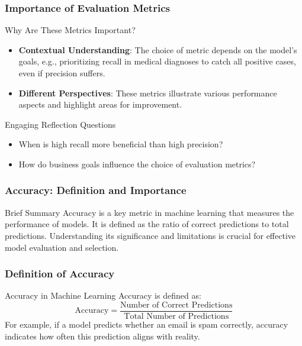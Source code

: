 \documentclass[aspectratio=169]{beamer}
\begin{document}
\begin{frame}[fragile]
    \frametitle{Importance of Evaluation Metrics}
    \begin{block}{Why Are These Metrics Important?}
        \begin{itemize}
            \item \textbf{Contextual Understanding}: The choice of metric depends on the model's goals, e.g., prioritizing recall in medical diagnoses to catch all positive cases, even if precision suffers.
            \item \textbf{Different Perspectives}: These metrics illustrate various performance aspects and highlight areas for improvement.
        \end{itemize}
    \end{block}
    
    \begin{block}{Engaging Reflection Questions}
        \begin{itemize}
            \item When is high recall more beneficial than high precision?
            \item How do business goals influence the choice of evaluation metrics?
        \end{itemize}
    \end{block}
\end{frame}

\begin{frame}[fragile]
    \frametitle{Accuracy: Definition and Importance}
    \begin{block}{Brief Summary}
        Accuracy is a key metric in machine learning that measures the performance of models. It is defined as the ratio of correct predictions to total predictions. Understanding its significance and limitations is crucial for effective model evaluation and selection.
    \end{block}
\end{frame}

\begin{frame}[fragile]
    \frametitle{Definition of Accuracy}
    \begin{block}{Accuracy in Machine Learning}
        Accuracy is defined as:
        \begin{equation} 
        \text{Accuracy} = \frac{\text{Number of Correct Predictions}}{\text{Total Number of Predictions}} 
        \end{equation}
        For example, if a model predicts whether an email is spam correctly, accuracy indicates how often this prediction aligns with reality.
    \end{block}
\end{frame}
\end{document}
